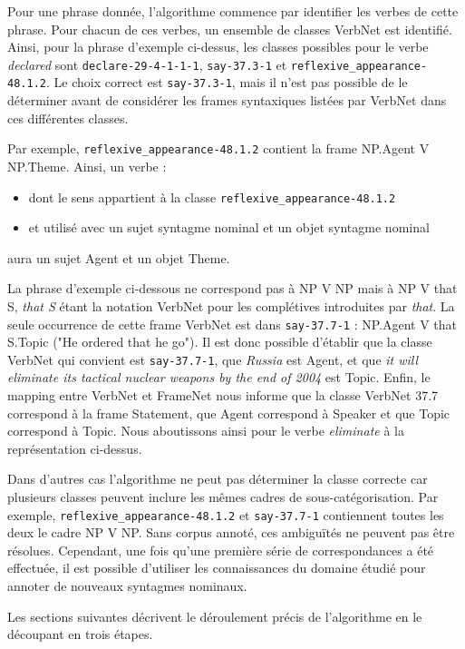 Pour une phrase donnée, l'algorithme commence par identifier les verbes de
cette phrase. Pour chacun de ces verbes, un ensemble de classes VerbNet est
identifié. Ainsi, pour la phrase d'exemple ci-dessus, les classes possibles
pour le verbe \textit{declared} sont \texttt{declare-29-4-1-1-1},
\texttt{say-37.3-1} et \texttt{reflexive\_appearance-48.1.2}. Le choix correct
est \texttt{say-37.3-1}, mais il n'est pas possible de le déterminer avant de
considérer les frames syntaxiques listées par VerbNet dans ces différentes
classes.


Par exemple, \texttt{reflexive\_appearance-48.1.2} contient la frame NP.Agent V
NP.Theme. Ainsi, un verbe :
\begin{itemize}
    \item dont le sens appartient à la classe \texttt{reflexive\_appearance-48.1.2}
    \item et utilisé avec un sujet syntagme nominal et un objet syntagme nominal
\end{itemize}
aura un sujet Agent et un objet Theme.

La phrase d'exemple ci-dessous ne correspond pas à NP V NP mais à NP V that S,
\emph{that S} étant la notation VerbNet pour les complétives introduites par
\emph{that}. La seule occurrence de cette frame VerbNet est dans
\texttt{say-37.7-1} : NP.Agent V that S.Topic ("He ordered that he go"). Il est
donc possible d'établir que la classe VerbNet qui convient est
\texttt{say-37.7-1}, que \emph{Russia} est Agent, et que \textit{it will
eliminate its tactical nuclear weapons by the end of 2004} est Topic. Enfin, le
mapping entre VerbNet et FrameNet nous informe que la classe VerbNet 37.7
correspond à la frame Statement, que Agent correspond à Speaker et que Topic
correspond à Topic.  Nous aboutissons ainsi pour le verbe \emph{eliminate} à la
représentation ci-dessus.

Dans d'autres cas l'algorithme ne peut pas déterminer la classe correcte car
plusieurs classes peuvent inclure les mêmes cadres de sous-catégorisation. Par
exemple, \texttt{reflexive\_appearance-48.1.2} et \texttt{say-37.7-1}
contiennent toutes les deux le cadre NP V NP. Sans corpus annoté, ces
ambiguïtés ne peuvent pas être résolues. Cependant, une fois qu'une première
série de correspondances a été effectuée, il est possible d'utiliser les
connaissances du domaine étudié pour annoter de nouveaux syntagmes nominaux.

Les sections suivantes décrivent le déroulement précis de l'algorithme en le
découpant en trois étapes.


